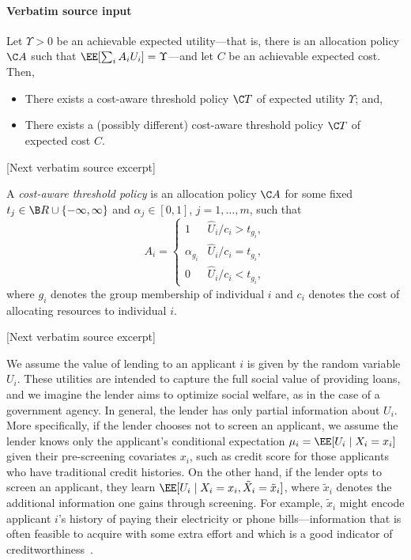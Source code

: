 \documentclass[10pt]{article}
\begin{document}
\paragraph{Verbatim source input}
\begin{ReviewVerbatim}
\begin{lem}
\label{lem:full_range}
    Let \(\Upsilon > 0\) be an achievable expected utility---that is, there is an allocation policy \(\C A\) such that \(\EE[\sum_i A_i U_i] = \Upsilon\)---and let \(C\) be an achievable expected cost.
    Then,
        \begin{itemize}
            \item There exists a cost-aware threshold policy \(\C T\) of expected utility \(\Upsilon\); and,
            \item There exists a (possibly different) cost-aware threshold policy \(\C T\) of expected cost \(C\).
        \end{itemize}
\end{lem}

[Next verbatim source excerpt]

\begin{defn}
    A \emph{cost-aware threshold policy} is an allocation policy \(\C A\) for some fixed \(t_j \in \B R \cup \{-\infty, \infty\}\) and \(\alpha_j \in [0,1]\), \(j = 1, \ldots, m\), such that
        \begin{equation*}
            A_i = \begin{cases}
                1 & \hat U_i / c_i > t_{g_i},\\
                \alpha_{g_i} & \hat U_i / c_i = t_{g_i}, \\
                0 & \hat U_i / c_i < t_{g_i},
            \end{cases}
        \end{equation*}
    where \(g_i\) denotes the group membership of individual \(i\) and \(c_i\) denotes the cost of allocating resources to individual \(i\).
\end{defn}

[Next verbatim source excerpt]

We assume the value of lending to an applicant \(i\) is given by the random variable \(U_i\).
These utilities are intended to capture the full social value of providing loans, and we imagine the lender aims to optimize social welfare, as in the case of a government agency.
In general, the lender has only partial information about \(U_i\). More specifically, if the lender chooses not to screen an applicant, we assume the lender knows only the applicant's conditional expectation \(\mu_i = \EE [U_i \mid X_i = x_i]\)
given their pre-screening covariates \(x_i\), such as credit score for those applicants who have traditional credit histories.
On the other hand, if the lender opts to screen an applicant, they learn \(\EE[U_i \mid X_i = x_i, \tilde{X}_i = \tilde{x}_i]\), where \(\tilde{x}_i\) denotes the additional information one gains through screening.
For example, \(\tilde{x}_i\) might encode applicant \(i\)'s history of paying
their electricity or phone bills---information that is often feasible to acquire with some extra effort and which is a good indicator of creditworthiness~\cite{fdic2018}.


\end{ReviewVerbatim}
\end{document}
